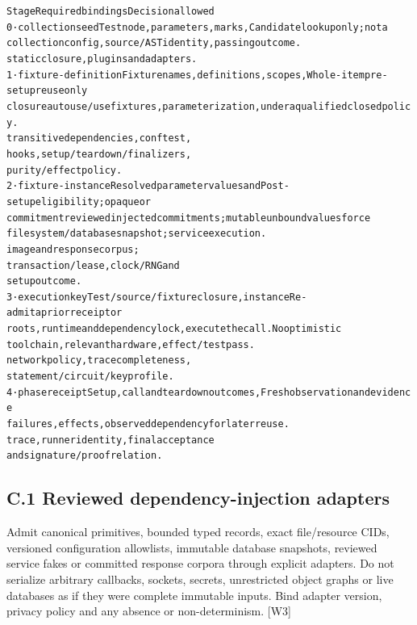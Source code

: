 \documentclass{article}
\begin{document}
\begingroup\fontsize{7}{8.4}\selectfont
\begin{alltt}
Stage                     Required bindings                          Decision allowed
0 · collection seed       Test node, parameters, marks,              Candidate lookup only; not a
                          collection config, source/AST identity,    passing outcome.
                          static closure, plugins and adapters.
1 · fixture-definition    Fixture names, definitions, scopes,        Whole-item pre-setup reuse only
closure                   autouse/usefixtures, parameterization,     under a qualified closed policy.
                          transitive dependencies, conftest,
                          hooks, setup/teardown/finalizers,
                          purity/effect policy.
2 · fixture-instance      Resolved parameter values and              Post-setup eligibility; opaque or
commitment                reviewed injected commitments;             mutable unbound values force
                          filesystem/database snapshot; service      execution.
                          image and response corpus;
                          transaction/lease, clock/RNG and
                          setup outcome.
3 · execution key         Test/source/fixture closure, instance      Re-admit a prior receipt or
                          roots, runtime and dependency lock,        execute the call. No optimistic
                          toolchain, relevant hardware, effect/      test pass.
                          network policy, trace completeness,
                          statement/circuit/key profile.
4 · phase receipt         Setup, call and teardown outcomes,         Fresh observation and evidence
                          failures, effects, observed dependency     for later reuse.
                          trace, runner identity, final acceptance
                          and signature/proof relation.
\end{alltt}\endgroup


\subsection*{C.1 Reviewed dependency-injection adapters}

Admit canonical primitives, bounded typed records, exact file/resource CIDs, versioned configuration
allowlists, immutable database snapshots, reviewed service fakes or committed response corpora
through explicit adapters. Do not serialize arbitrary callbacks, sockets, secrets, unrestricted object
graphs or live databases as if they were complete immutable inputs. Bind adapter version, privacy
policy and any absence or non-determinism. [W3]
\end{document}
